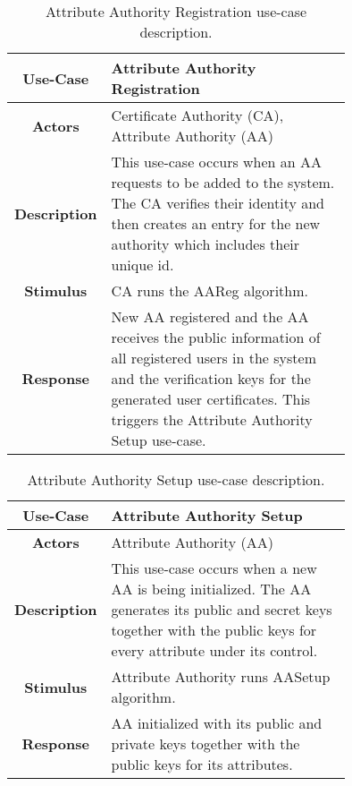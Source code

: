 \begin{table}[]
\centering
\begin{tabular}{|c|p{0.75\linewidth}|}
	\hline
	\textbf{Use-Case}    & Attribute Authority Registration                                   \\ \hline
	\textbf{Actors}      & Certificate Authority (CA), Attribute Authority (AA)                         \\ \hline
	\textbf{Description} & This use-case occurs when an AA requests to be added to the system. The CA verifies their identity and then creates an entry for the new authority which includes their unique id. \\ \hline
	\textbf{Stimulus}    & CA runs the AAReg algorithm.                   \\ \hline
	\textbf{Response}    & New AA registered and the AA receives the public information of all registered users in the system and the verification keys for the generated user certificates. This triggers the Attribute Authority Setup use-case.            \\ \hline
\end{tabular}
\caption{Attribute Authority Registration  use-case description.}
\label{tab:use_case_aareg}
\end{table}

\begin{table}[]
	\centering
	\begin{tabular}{|c|p{0.75\linewidth}|}
		\hline
		\textbf{Use-Case}    & Attribute Authority Setup                                   \\ \hline
		\textbf{Actors}      & Attribute Authority (AA)                         \\ \hline
		\textbf{Description} & This use-case occurs when a new AA is being initialized. The AA generates its public and secret keys together with the public keys for every attribute under its control.  \\ \hline
		\textbf{Stimulus}    & Attribute Authority runs AASetup algorithm.                    \\ \hline
		\textbf{Response}    & AA initialized with its public and private keys together with the public keys for its attributes.            \\ \hline
	\end{tabular}
	\caption{Attribute Authority Setup use-case description.}
	\label{tab:use_case_aasetup}
\end{table}

